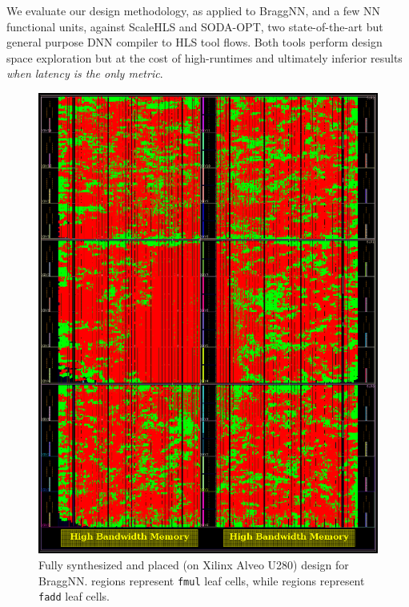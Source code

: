We evaluate our design methodology, as applied to BraggNN, and a few NN functional units, against ScaleHLS\cite{ye2021scalehls} and SODA-OPT\cite{9516615}, two state-of-the-art but general purpose DNN compiler to HLS tool flows.
Both tools perform design space exploration but at the cost of high-runtimes and ultimately inferior results \emph{when latency is the only metric}.


\begin{figure}
	\includegraphics[width=\columnwidth]{figures/full_fpga.png}
	\caption{Fully synthesized and placed (on Xilinx Alveo U280) design for BraggNN. \crule[red]{0.25cm}{0.25cm} regions represent \texttt{fmul} leaf cells, while \crule[green]{0.25cm}{0.25cm} regions represent \texttt{fadd} leaf cells.}\label{fig:placed_braggnn}
\end{figure}

